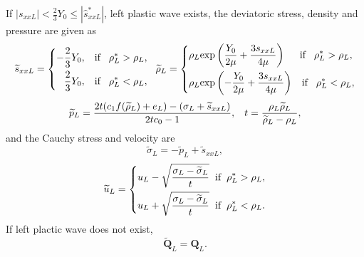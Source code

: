 \documentclass{article}
\numberwithin{equation}{section}
\numberwithin{table}{section}
\begin{document}
\vspace{0.3cm} \hspace{0.4cm}  If $|s_{xxL}| < \frac{2}{3}Y_0 \le |\hat{s}_{xxL}^*| $, left plastic wave exists, the deviatoric stress, density and pressure  are given as
\begin{equation*}
  \widetilde{s}_{xxL} =\left\{ \begin{aligned}
	  -\frac{2}{3}Y_0, \hspace{0.3cm} \text{if} \hspace{0.3cm} \rho_L^* > \rho_L,\\
	  \frac{2}{3}Y_0, \hspace{0.3cm} \text{if} \hspace{0.3cm} \rho_L^* < \rho_L,\\
	\end{aligned}\right.
	\hspace{0.2cm} \widetilde{\rho}_{L} = \left\{ \begin{aligned}
	  & \rho_L \text{exp}\left(\frac{Y_0}{2\mu}+\frac{3 s_{xxL}}{4\mu}\right)  \hspace{0.5cm} \text{if} \hspace{0.3cm} \rho_L^* > \rho_L,\\
& \rho_L \text{exp}\left(-\frac{Y_0}{2\mu}+\frac{3 s_{xxL}}{4\mu}\right)
\hspace{0.3cm} \text{if} \hspace{0.3cm} \rho_L^* < \rho_L,\\
  \end{aligned}\right.
 \end{equation*}
\begin{equation*}
  \widetilde{p}_L= \frac{2t(c_1f(\widetilde{\rho}_L)+e_L)-(\sigma_L+\widetilde{s}_{xxL})}{2tc_0-1}, \hspace{0.3cm}
t=\frac{\rho_L \widetilde{\rho}_L}{\widetilde{\rho}_L-\rho_L},
\end{equation*}
and the Cauchy stress and velocity are
\begin{equation*}
\widetilde{\sigma}_L = -\widetilde{p}_L+\widetilde{s}_{xxL},
\end{equation*}
\begin{equation*}
  \widetilde{u}_L= \left\{
  \begin{aligned}
	u_L-\sqrt{\frac{\sigma_L-\widetilde{\sigma}_L}{t}} \hspace{0.2cm} \text{if} \hspace{0.2cm} \rho_L^* >\rho_L,\\
	u_L+\sqrt{\frac{\sigma_L-\widetilde{\sigma}_L}{t}} \hspace{0.2cm} \text{if} \hspace{0.2cm} \rho_L^* <\rho_L.\\
\end{aligned} \right.
\end{equation*}
If left plactic wave does not exist,
\begin{equation*}
  \widetilde{\bm{Q}}_L = \bm{Q}_L.
\end{equation*}
\end{document}
